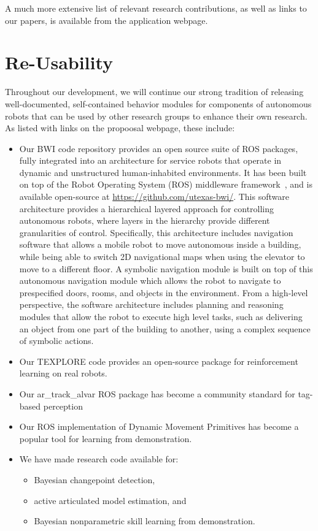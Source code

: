 \documentclass[runningheads,a4paper]{llncs}
\begin{document}
A much more extensive list of relevant research contributions, as well
as links to our papers, is available from the application webpage.

\section{Re-Usability}
\label{sec:reuse}

Throughout our development, we will continue our strong tradition of releasing well-documented, self-contained behavior modules for components of autonomous robots that can be used by other research groups to enhance their own research.  As listed with links on the propoosal webpage, these include:

\begin{itemize}

\item Our BWI code repository provides an open source suite of ROS
packages, fully integrated into an architecture for service robots
that operate in dynamic and unstructured human-inhabited environments.
It has been built on top of the Robot Operating System (ROS)
middleware framework~\cite{quigley2009ros}, and is available
open-source at \url{https://github.com/utexas-bwi/}. This software
architecture provides a hierarchical layered approach for controlling
autonomous robots, where layers in the hierarchy provide different
granularities of control.  Specifically, this architecture includes
navigation software that allows a mobile robot to move autonomous
inside a building, while being able to switch 2D navigational maps
when using the elevator to move to a different floor. A symbolic
navigation module is built on top of this autonomous navigation module
which allows the robot to navigate to prespecified doors, rooms, and
objects in the environment.  From a high-level perspective, the software
architecture includes planning and reasoning modules that allow the
robot to execute high level tasks, such as delivering an object from
one part of the building to another, using a complex sequence of
symbolic actions.

\item Our TEXPLORE code provides an open-source package for
reinforcement learning on real robots.

\item Our ar\_track\_alvar ROS package has become a community standard
for tag-based perception

\item Our ROS implementation of Dynamic Movement Primitives has become
a popular tool for learning from demonstration.

\item We have made research code available for:

  \begin{itemize}
  \item Bayesian changepoint detection,
  \item active articulated model estimation, and
  \item Bayesian nonparametric skill learning from demonstration.
  \end{itemize}

\end{itemize}
\end{document}
